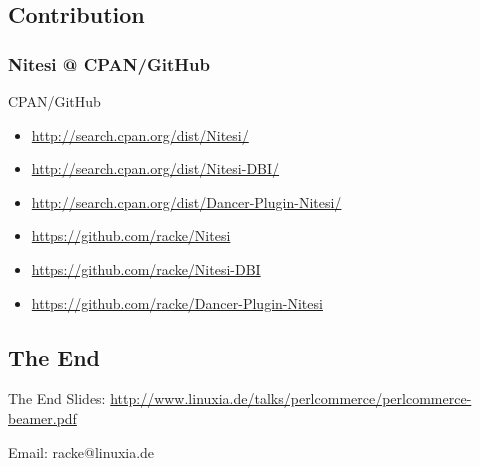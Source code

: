 \subsection{Contribution}
\subsubsection{Nitesi @ CPAN/GitHub}
\begin{frame}{CPAN/GitHub}
\begin{itemize}
\item \url{http://search.cpan.org/dist/Nitesi/}
\item \url{http://search.cpan.org/dist/Nitesi-DBI/}
\item \url{http://search.cpan.org/dist/Dancer-Plugin-Nitesi/}
\end{itemize}
\begin{itemize}
\item \url{https://github.com/racke/Nitesi}
\item \url{https://github.com/racke/Nitesi-DBI}
\item \url{https://github.com/racke/Dancer-Plugin-Nitesi}
\end{itemize}
\end{frame}

\subsection{The End}
\begin{frame}{The End}
Slides:
\url{http://www.linuxia.de/talks/perlcommerce/perlcommerce-beamer.pdf}

Email:
racke@linuxia.de
\end{frame}



